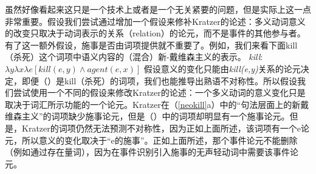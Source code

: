 虽然好像看起来这只是一个技术上或者是一个无关紧要的问题，但是实际上这一点非常重要。假设我们尝试通过增加一个假设来修补Kratzer的论述：多义动词意义的改变只取决于动词表示的关系（relation）的论元，而不是事件的其他参与者。有了这一额外假设，施事是否由词项提供就不重要了。例如，我们来看下面kill（杀死）这个词项中语义内容的（混合）新-戴维森主义的表示。
\ea 
\emph{kill}: $\lambda y\lambda x\lambda e[kill(e,y) \wedge agent(e, x)]$ 
\z
假设意义的变化只能由\emph{kill(e,y)}关系的论元决定，即便（）是kill（杀死）的词项，我们也能推导出熟语不对称性。所以假设我们尝试使用一个不同的假设来修改Kratzer的论述：一个多义动词的意义变化只是取决于词汇所示功能的一个论元。Kratzer在（\ref{neokill}a）中的“句法层面上的新戴维森主义”的词项缺少施事论元，但是（）中的词项却明显有一个施事论元。但是，Kratzer的词项仍然无法预测不对称性，因为正如上面所述，该词项有一个e论元，所以意义的变化取决于“e的施事”。正如上面所述，那个事件论元不能删除（例如通过存在量词），因为在事件识别引入施事的无声轻动词中需要该事件论元\citep[]{Kratzer96a}。

